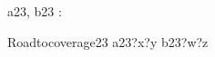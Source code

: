 \begin{circus}
\circchannel a23, b23 : \nat \cross \nat \\
\end {circus}
\begin {circus}
\circprocess Roadtocoverage23 \circdef \circbegin
	\circspot
	    a23?x?y \then \Skip \extchoice b23?w?z \then \Skip \\
	\circend
\end{circus}
